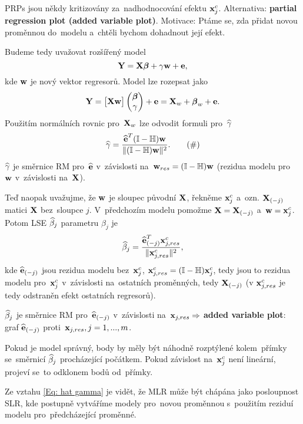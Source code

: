 \begin{remark}
	PRPs jsou někdy kritizovány za~nadhodnocování efektu $\textbf{x}_j^c$. \linebreak
	Alternativa: \textbf{partial regression plot (added variable plot)}. \linebreak
	Motivace: Ptáme se, zda přidat novou proměnnou do~modelu a~chtěli bychom dohadnout její efekt.
	
	Budeme tedy uvažovat rozšířený model
	 $$
	\textbf{Y} = \textbf{X} \boldsymbol{\beta} + \gamma \mathbf{w} + \textbf{e},
	 $$
	kde $\mathbf{w}$ je nový vektor regresorů. Model lze rozepsat jako
	 $$
	\textbf{Y} = \begin{bmatrix}
	\textbf{X} \mathbf{w}
	\end{bmatrix} \begin{pmatrix}
	\boldsymbol{\beta} \\ \gamma
	\end{pmatrix} + \textbf{e} = \textbf{X}_w + \boldsymbol{\beta}_w + \textbf{e}.
	 $$
	Použitím normálních rovnic pro~$\textbf{X}_w$ lze odvodit formuli pro~$\widehat{\gamma}$
	\begin{equation*}
		\widehat{\gamma} = \frac{\widehat{\textbf{e}}^T (\mathbb{I} - \mathbb{H}) \mathbf{w}}{\| (\mathbb{I} - \mathbb{H})\mathbf{w} \|^2}.
		\tag{\#}
		\label{Eq: hat gamma}
	\end{equation*}
	 $\widehat{\gamma}$ je směrnice RM pro~$\widehat{\textbf{e}}$ v~závislosti na~$\mathbf{w}_{res} = (\mathbb{I} - \mathbb{H})\mathbf{w}$ (rezidua modelu pro~$\mathbf{w}$ v~závislosti na~$\textbf{X}$).
	
	Teď naopak uvažujme, že $\mathbf{w}$ je sloupec původní $\textbf{X}$, řekněme $\textbf{x}_j^c$ a~ozn. $\textbf{X}_{(-j)}$ matici $\textbf{X}$ bez~sloupce $j$. V~předchozím modelu pomožme $\textbf{X} = \textbf{X}_{(-j)}$ a~$\mathbf{w} = \textbf{x}_j^c$. Potom  LSE $\widehat{\beta}_j$ parametru $\beta_j$ je
	 $$
	\widehat{\beta}_j = \frac{\widehat{\textbf{e}}_{(-j)}^T \textbf{x}_{j, res}^c}{\| \textbf{x}_{j,res}^c \|^2},
	 $$
	kde $\widehat{\textbf{e}}_{(-j)}$ jsou rezidua modelu bez~$\textbf{x}_j^c$, $\textbf{x}_{j,res}^c = (\mathbb{I} - \mathbb{H}) \textbf{x}_j^c$, tedy jsou to rezidua modelu pro~$\textbf{x}_j^c$ v~závislosti na~ostatních proměnných, tedy $\textbf{X}_{(-j)}$ (v $\textbf{x}_{j,res}^c$ je tedy odstraněn efekt ostatních regresorů).
	
	 $\widehat{\beta}_j$ je směrnice RM pro~$\widehat{\textbf{e}}_{(-j)}$ v~závislosti na~$\textbf{x}_{j, res} \Rightarrow$ \linebreak
	\textbf{added variable plot}: graf $\widehat{\textbf{e}}_{(-j)}$ proti~$\textbf{x}_{j, res}, j = 1,..., m$.
	
	Pokud je model správný, body by měly být náhodně rozptýlené kolem~přímky se~směrnicí $\widehat{\beta}_j$ procházející počátkem. Pokud závislost na~$\textbf{x}_j^c$ není lineární, projeví se~to odklonem bodů od~přímky.
\end{remark}

\begin{remark}
Ze vztahu \eqref{Eq: hat gamma} je vidět, že MLR může být chápána jako posloupnost SLR, kde postupně vytváříme modely pro~novou proměnnou s~použitím reziduí modelu pro~předcházející proměnné.
\end{remark}

